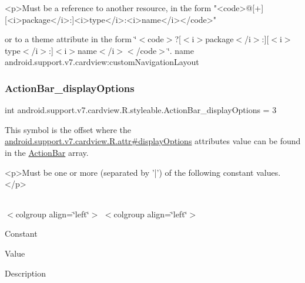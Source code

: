 \begin{DoxyVerb}      <p>Must be a reference to another resource, in the form "<code>@[+][<i>package</i>:]<i>type</i>:<i>name</i></code>"
\end{DoxyVerb}
 or to a theme attribute in the form \char`\"{}$<$code$>$?\mbox{[}$<$i$>$package$<$/i$>$\+:\mbox{]}\mbox{[}$<$i$>$type$<$/i$>$\+:\mbox{]}$<$i$>$name$<$/i$>$$<$/code$>$\char`\"{}.  name android.\+support.\+v7.\+cardview\+:custom\+Navigation\+Layout \mbox{\label{classandroid_1_1support_1_1v7_1_1cardview_1_1R_1_1styleable_a87d39d276949634b87ffd4dd7d2579d2}} 
\subsubsection{\texorpdfstring{Action\+Bar\+\_\+display\+Options}{ActionBar\_displayOptions}}
{\footnotesize\ttfamily int android.\+support.\+v7.\+cardview.\+R.\+styleable.\+Action\+Bar\+\_\+display\+Options = 3\hspace{0.3cm}{\ttfamily [static]}}

This symbol is the offset where the \hyperlink{classandroid_1_1support_1_1v7_1_1cardview_1_1R_1_1attr_a95f87179f6c66822d84023d578c161b2}{android.\+support.\+v7.\+cardview.\+R.\+attr\#display\+Options} attribute\textquotesingle{}s value can be found in the \hyperlink{classandroid_1_1support_1_1v7_1_1cardview_1_1R_1_1styleable_a0cbf7f776e31f78bb0a2b558daf176f8}{Action\+Bar} array.

\begin{DoxyVerb}      <p>Must be one or more (separated by '|') of the following constant values.</p>
\end{DoxyVerb}
 \tabulinesep=1mm
\begin{longtabu} spread 0pt [c]{*{0}{|X[-1]}|}
\hline
\end{longtabu}
$<$colgroup align=\char`\"{}left\char`\"{}$>$ $<$colgroup align=\char`\"{}left\char`\"{}$>$ 

Constant

Value

Description 

